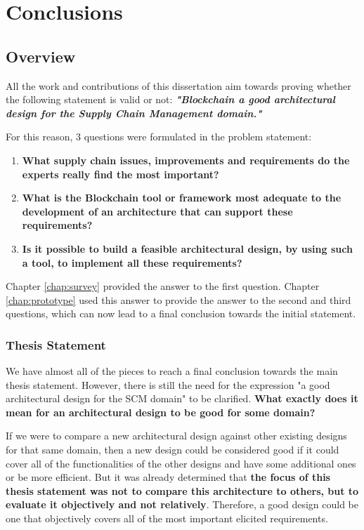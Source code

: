 \chapter{Conclusions}
\label{chap:conclusions}
\minitoc \mtcskip \noindent

\section{Overview}

All the work and contributions of this dissertation aim towards proving whether the following statement is valid or not: \textbf{\textit{"Blockchain a good architectural design for the Supply Chain Management domain."}}

 For this reason, 3 questions were formulated in the problem statement:
\begin{enumerate}
    \item \textbf{What supply chain issues, improvements and requirements do the experts really find the most important?}
    \item \textbf{What is the Blockchain tool or framework most adequate to the development of an architecture that can support these requirements?}
    \item \textbf{Is it possible to build a feasible architectural design, by using such a tool, to implement all these requirements?}
\end{enumerate}
    
Chapter \ref{chap:survey} provided the answer to the first question. Chapter \ref{chap:prototype} used this answer to provide the answer to the second and third questions, which can now lead to a final conclusion towards the initial statement.


\subsection*{Thesis Statement}
\par We have almost all of the pieces to reach a final conclusion towards the main thesis statement. However, there is still the need for the expression "a good architectural design for the SCM domain" to be clarified. \textbf{What exactly does it mean for an architectural design to be good for some domain?} 

If we were to compare a new architectural design against other existing designs for that same domain, then a new design could be considered good if it could cover all of the functionalities of the other designs and have some additional ones or be more efficient. But it was already determined that \textbf{the focus of this thesis statement was not to compare this architecture to others, but to evaluate it objectively and not relatively}. Therefore, a good design could be one that objectively covers all of the most important elicited requirements.

